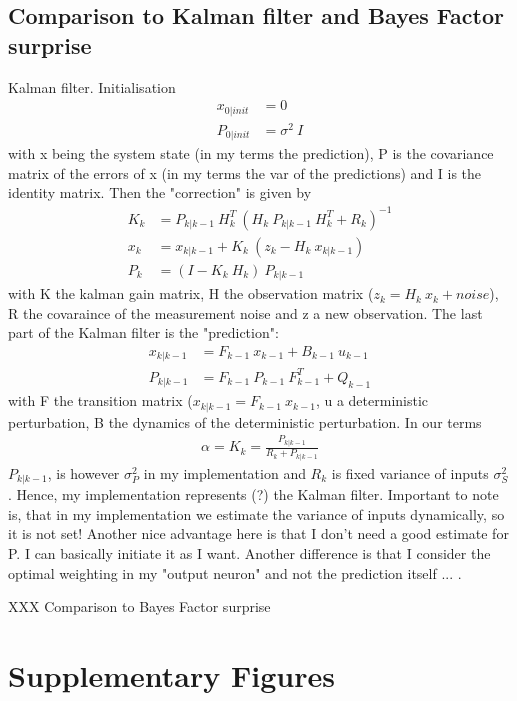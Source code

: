 \documentclass[10pt,a4paper,draft]{article}
\begin{document}
\subsection*{Comparison to Kalman filter and Bayes Factor surprise}
%
Kalman filter. Initialisation
%
\begin{align*}
x_{0|init} &= 0 \\
P_{0|init} &= \sigma^2\ I
\end{align*}
%
with x being the system state (in my terms the prediction), P is the covariance matrix of the errors of x (in my terms the var of the predictions) and I is the identity matrix.
%
Then the "correction" is given by
%
\begin{align*}
K_k &= P_{k|k-1}\ H_k^T\ \left( H_k\ P_{k|k-1}\ H_k^T + R_k \right)^{-1} \\
x_k &= x_{k|k-1} + K_k\ \left( z_k - H_k\ x_{k|k-1}\right) \\
P_k &= \left( I - K_k\ H_k\right)\ P_{k|k-1}
\end{align*}
%
with K the kalman gain matrix, H the observation matrix ($z_k = H_k\ x_k + noise$), R the covaraince of the measurement noise and z a new observation. The last part of the Kalman filter is the "prediction":
%
\begin{align*}
x_{k|k-1} &= F_{k-1}\ x_{k-1} + B_{k-1}\ u_{k-1} \\
P_{k|k-1} &= F_{k-1}\ P_{k-1}\ F_{k-1}^T + Q_{k-1}
\end{align*}
%
with F the transition matrix ($x_{k|k-1} = F_{k-1}\ x_{k-1}$, u a deterministic perturbation, B the dynamics of the deterministic perturbation. In our terms
%
\begin{align*}
\alpha = K_k = \frac{P_{k|k-1}}{R_k + P_{k|k-1}}
\end{align*}
%
$P_{k|k-1}$, is however $\sigma_P^2$ in my implementation and $R_k$ is fixed variance of inputs $\sigma_S^2$. Hence, my implementation represents (?) the Kalman filter. Important to note is, that in my implementation we estimate the variance of inputs dynamically, so it is not set! Another nice advantage here is that I don't need a good estimate for P. I can basically initiate it as I want. Another difference is that I consider the optimal weighting in my "output neuron" and not the prediction itself ... .

XXX Comparison to Bayes Factor surprise

\section*{Supplementary Figures}
\setcounter{figure}{0}
\renewcommand{\thefigure}{S\arabic{figure}}
\end{document}
